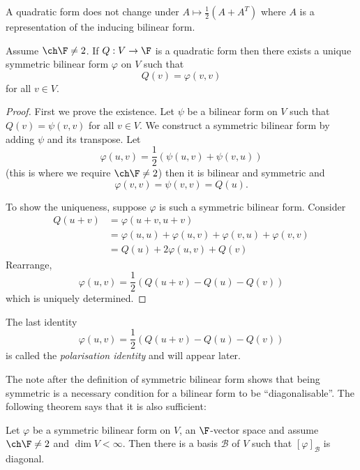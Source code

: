 \documentclass[a4paper]{article}
\newcommand*{\basis}{\mathcal}
\theoremstyle{definition}
\begin{document}
\begin{remark}
  A quadratic form does not change under \(A \mapsto \frac{1}{2}(A + A^T)\) where \(A\) is a representation of the inducing bilinear form.
\end{remark}

\begin{proposition}
  Assume \(\ch \F \neq 2\). If \(Q: V \to \F\) is a quadratic form then there exists a unique symmetric bilinear form \(\varphi\) on \(V\) such that
  \[
    Q(v) = \varphi(v, v)
  \]
  for all \(v \in V\).
\end{proposition}

\begin{proof}
  First we prove the existence. Let \(\psi\) be a bilinear form on \(V\) such that \(Q(v) = \psi(v, v)\) for all \(v \in V\). We construct a symmetric bilinear form by adding \(\psi\) and its transpose. Let
  \[
    \varphi(u, v) = \frac{1}{2}(\psi(u, v) + \psi(v, u))
  \]
  (this is where we require \(\ch \F \neq 2\)) then it is bilinear and symmetric and
  \[
    \varphi(v, v) = \psi(v, v) = Q(u).
  \]

  To show the uniqueness, suppose \(\varphi\) is such a symmetric bilinear form. Consider
  \begin{align*}
    Q(u + v) &= \varphi(u + v, u + v) \\
             &= \varphi(u, u) + \varphi(u, v) + \varphi(v, u) + \varphi(v, v) \\
             &= Q(u) + 2\varphi(u, v) + Q(v)
  \end{align*}
  Rearrange,
  \[
    \varphi(u, v) = \frac{1}{2}(Q(u + v) - Q(u) - Q(v))
  \]
  which is uniquely determined.
\end{proof}

\begin{remark}
  The last identity
  \[
    \varphi(u, v) = \frac{1}{2}(Q(u + v) - Q(u) - Q(v))
  \]
  is called the \emph{polarisation identity} and will appear later.
\end{remark}

The note after the definition of symmetric bilinear form shows that being symmetric is a necessary condition for a bilinear form to be ``diagonalisable''. The following theorem says that it is also sufficient:

\begin{theorem}
  Let \(\varphi\) be a symmetric bilinear form on \(V\), an \(\F\)-vector space and assume \(\ch \F \neq 2\) and \(\dim V < \infty\). Then there is a basis \(\basis B\) of \(V\) such that \([\varphi]_{\basis B}\) is diagonal.
\end{theorem}
\end{document}
